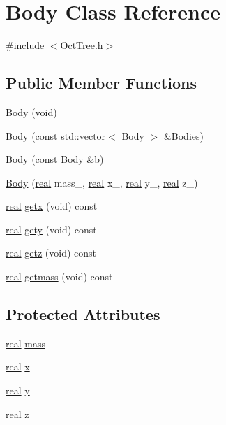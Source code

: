 \section{Body Class Reference}
\label{classBody}


{\ttfamily \#include $<$OctTree.h$>$}

\subsection*{Public Member Functions}
\begin{DoxyCompactItemize}
\item 
\hyperlink{classBody_a9bcca1c329e0c0eac2deaf806067265e}{Body} (void)
\item 
\hyperlink{classBody_a7c5392107a6a4eefb235e5d084327706}{Body} (const std::vector$<$ \hyperlink{classBody}{Body} $>$ \&Bodies)
\item 
\hyperlink{classBody_af910bd227d2efa484235644b86fa5591}{Body} (const \hyperlink{classBody}{Body} \&b)
\item 
\hyperlink{classBody_a2ec20fbc569b44d03f14927f3d370fac}{Body} (\hyperlink{Global_8h_a031f8951175b43076c2084a6c2173410}{real} mass\_\-, \hyperlink{Global_8h_a031f8951175b43076c2084a6c2173410}{real} x\_\-, \hyperlink{Global_8h_a031f8951175b43076c2084a6c2173410}{real} y\_\-, \hyperlink{Global_8h_a031f8951175b43076c2084a6c2173410}{real} z\_\-)
\item 
\hyperlink{Global_8h_a031f8951175b43076c2084a6c2173410}{real} \hyperlink{classBody_a61966095d7c49f9f5cfbd6b44ee4038e}{getx} (void) const 
\item 
\hyperlink{Global_8h_a031f8951175b43076c2084a6c2173410}{real} \hyperlink{classBody_a95027faddf26cb1f9f817fa0e0ac5fc5}{gety} (void) const 
\item 
\hyperlink{Global_8h_a031f8951175b43076c2084a6c2173410}{real} \hyperlink{classBody_a1de0ff2646d7eafad6b85f786f635172}{getz} (void) const 
\item 
\hyperlink{Global_8h_a031f8951175b43076c2084a6c2173410}{real} \hyperlink{classBody_a348e0a926450c921e680a00cb702360a}{getmass} (void) const 
\end{DoxyCompactItemize}
\subsection*{Protected Attributes}
\begin{DoxyCompactItemize}
\item 
\hyperlink{Global_8h_a031f8951175b43076c2084a6c2173410}{real} \hyperlink{classBody_ae90051f181de1be6b376d2583907acd8}{mass}
\item 
\hyperlink{Global_8h_a031f8951175b43076c2084a6c2173410}{real} \hyperlink{classBody_aea6e1aa5de0e3511484847e1babef086}{x}
\item 
\hyperlink{Global_8h_a031f8951175b43076c2084a6c2173410}{real} \hyperlink{classBody_a9165fbd0f5998a1c8b2d8fe9dd50af6f}{y}
\item 
\hyperlink{Global_8h_a031f8951175b43076c2084a6c2173410}{real} \hyperlink{classBody_ae125fbcda6663e5853ec480ae8eb348f}{z}
\end{DoxyCompactItemize}


